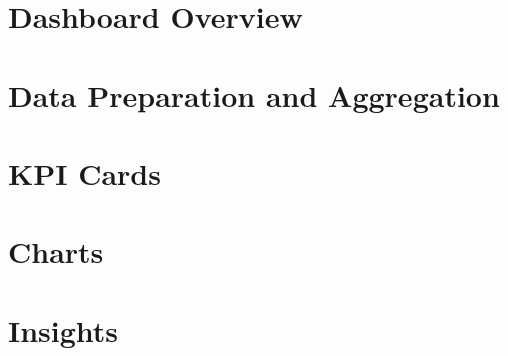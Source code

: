 \documentclass[11pt]{article}
\begin{document}
\section{Dashboard Overview}


\section{Data Preparation and Aggregation}





\section{KPI Cards}






\section{Charts}




\section{Insights}

\end{document}
